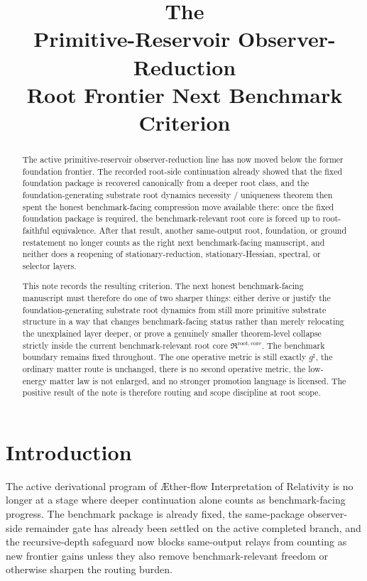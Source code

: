 \documentclass[11pt]{article}
\title{\textbf{The \TheoryName{}}\\[0.4em]
\large Primitive-Reservoir Observer-Reduction\\
\large Root Frontier Next Benchmark Criterion}
\author{}
\date{}
\newcommand{\Aflow}{\AE{}ther-flow}
\newcommand{\TheoryName}{\Aflow{} Interpretation of Relativity}
\newcommand{\CompletedMetric}{g^{\sharp}}
\newcommand{\RootCore}{\mathfrak R^{\mathrm{root,core}}}
\begin{document}
\maketitle

\begin{abstract}
The active primitive-reservoir observer-reduction line has now moved below the former foundation frontier. The recorded root-side continuation already showed that the fixed foundation package is recovered canonically from a deeper root class, and the foundation-generating substrate root dynamics necessity / uniqueness theorem then spent the honest benchmark-facing compression move available there: once the fixed foundation package is required, the benchmark-relevant root core is forced up to root-faithful equivalence. After that result, another same-output root, foundation, or ground restatement no longer counts as the right next benchmark-facing manuscript, and neither does a reopening of stationary-reduction, stationary-Hessian, spectral, or selector layers.

This note records the resulting criterion. The next honest benchmark-facing manuscript must therefore do one of two sharper things: either derive or justify the foundation-generating substrate root dynamics from still more primitive substrate structure in a way that changes benchmark-facing status rather than merely relocating the unexplained layer deeper, or prove a genuinely smaller theorem-level collapse strictly inside the current benchmark-relevant root core \(\RootCore\). The benchmark boundary remains fixed throughout. The one operative metric is still exactly \(\CompletedMetric\), the ordinary matter route is unchanged, there is no second operative metric, the low-energy matter law is not enlarged, and no stronger promotion language is licensed. The positive result of the note is therefore routing and scope discipline at root scope.
\end{abstract}

\section{Introduction}

The active derivational program of \TheoryName{} is no longer at a stage where deeper continuation alone counts as benchmark-facing progress. The benchmark package is already fixed, the same-package observer-side remainder gate has already been settled on the active completed branch, and the recursive-depth safeguard now blocks same-output relays from counting as new frontier gains unless they also remove benchmark-relevant freedom or otherwise sharpen the routing burden.
\end{document}
